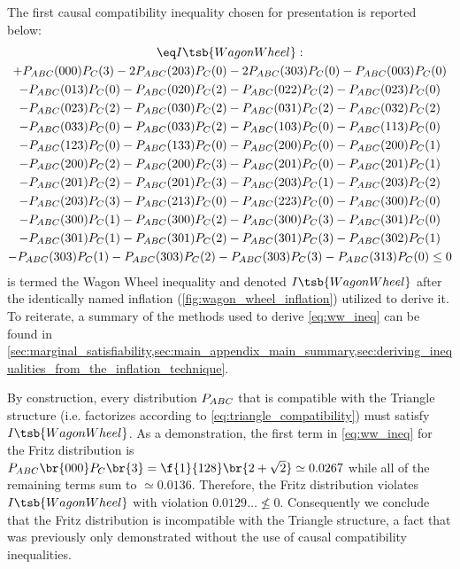 \documentclass[aps, 10pt, english, twoside, pra, nofootinbib, tightenlines, longbibliography, superscriptaddress]{revtex4-1}
\begin{document}
    The first causal compatibility inequality chosen for presentation is reported below:
    \begin{equation*}
    \begin{gathered}
    \eq\label{eq:ww_ineq}
    I\tsb{WagonWheel} : \\
    + P_{ABC}(000)P_{C}(3) - 2P_{ABC}(203)P_{C}(0) - 2P_{ABC}(303)P_{C}(0) - P_{ABC}(003)P_{C}(0) \\
    - P_{ABC}(013)P_{C}(0) - P_{ABC}(020)P_{C}(2) - P_{ABC}(022)P_{C}(2) - P_{ABC}(023)P_{C}(0) \\
    - P_{ABC}(023)P_{C}(2) - P_{ABC}(030)P_{C}(2) - P_{ABC}(031)P_{C}(2) - P_{ABC}(032)P_{C}(2) \\
    - P_{ABC}(033)P_{C}(0) - P_{ABC}(033)P_{C}(2) - P_{ABC}(103)P_{C}(0) - P_{ABC}(113)P_{C}(0) \\
    - P_{ABC}(123)P_{C}(0) - P_{ABC}(133)P_{C}(0) - P_{ABC}(200)P_{C}(0) - P_{ABC}(200)P_{C}(1) \\
    - P_{ABC}(200)P_{C}(2) - P_{ABC}(200)P_{C}(3) - P_{ABC}(201)P_{C}(0) - P_{ABC}(201)P_{C}(1) \\
    - P_{ABC}(201)P_{C}(2) - P_{ABC}(201)P_{C}(3) - P_{ABC}(203)P_{C}(1) - P_{ABC}(203)P_{C}(2) \\
    - P_{ABC}(203)P_{C}(3) - P_{ABC}(213)P_{C}(0) - P_{ABC}(223)P_{C}(0) - P_{ABC}(300)P_{C}(0) \\
    - P_{ABC}(300)P_{C}(1) - P_{ABC}(300)P_{C}(2) - P_{ABC}(300)P_{C}(3) - P_{ABC}(301)P_{C}(0) \\
    - P_{ABC}(301)P_{C}(1) - P_{ABC}(301)P_{C}(2) - P_{ABC}(301)P_{C}(3) - P_{ABC}(302)P_{C}(1) \\
    - P_{ABC}(303)P_{C}(1) - P_{ABC}(303)P_{C}(2) - P_{ABC}(303)P_{C}(3) - P_{ABC}(313)P_{C}(0) \leq 0
    \end{gathered}
    \end{equation*}
     is termed the Wagon Wheel inequality and denoted $I\tsb{WagonWheel}$ after the identically named inflation (\cref{fig:wagon_wheel_inflation}) utilized to derive it. To reiterate, a summary of the methods used to derive \cref{eq:ww_ineq} can be found in \cref{sec:marginal_satisfiability,sec:main_appendix_main_summary,sec:deriving_inequalities_from_the_inflation_technique}.

    By construction, every distribution $\prob[ABC]$ that is compatible with the Triangle structure (i.e. factorizes according to \cref{eq:triangle_compatibility}) must satisfy $I\tsb{WagonWheel}$. As a demonstration, the first term in \cref{eq:ww_ineq} for the Fritz distribution is $\prob[ABC]\br{000}\prob[C]\br{3} = \f{1}{128}\br{2 + \sqrt{2}} \simeq 0.0267$ while all of the remaining terms sum to $\simeq 0.0136$. Therefore, the Fritz distribution violates $I\tsb{WagonWheel}$ with violation $0.0129\ldots \not \leq 0$. Consequently we conclude that the Fritz distribution is incompatible with the Triangle structure, a fact that was previously only demonstrated without the use of causal compatibility inequalities.
\end{document}
